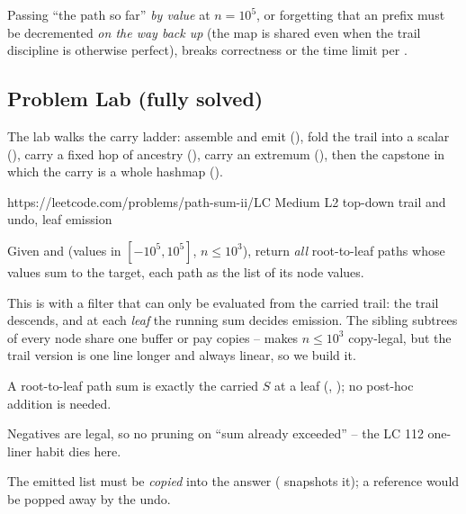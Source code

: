 \begin{warningbox}
Passing ``the path so far'' \emph{by value} at $n = 10^{5}$, or forgetting that
an  prefix must be decremented \emph{on the way back up}
(the map is shared even when the trail discipline is otherwise perfect), breaks
correctness or the time limit per .
\end{warningbox}

\subsection{Problem Lab (fully solved)}

The lab walks the carry ladder: assemble and emit (),
fold the trail into a scalar (), carry a fixed hop of
ancestry (), carry an extremum (),
then the capstone in which the carry is a whole hashmap
().

  {https://leetcode.com/problems/path-sum-ii/}{LC Medium L2}
  {top-down trail and undo, leaf emission}

\begin{problemstatement}
Given  and  (values in $[-10^{5}, 10^{5}]$,
$n \le 10^{3}$), return \emph{all} root-to-leaf paths whose values sum to the
target, each path as the list of its node values.
\end{problemstatement}

This is  with a filter that can only be evaluated from the
carried trail: the trail descends, and at each \emph{leaf} the running sum
decides emission. The sibling subtrees of every node share one buffer or pay
copies --  makes $n \le 10^{3}$ copy-legal, but the
trail version is one line longer and always linear, so we build it.

\begin{observation}
A root-to-leaf path sum is exactly the carried $S$ at a leaf
(, ); no post-hoc addition is needed.
\end{observation}
\begin{observation}
Negatives are legal, so no pruning on ``sum already exceeded'' -- the
LC 112 one-liner habit dies here.
\end{observation}
\begin{observation}
The emitted list must be \emph{copied} into the answer
( snapshots it); a reference would be popped away by
the undo.
\end{observation}

